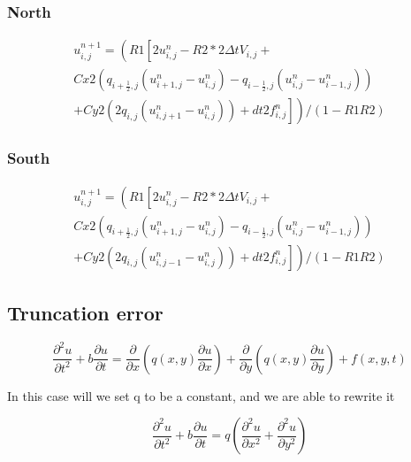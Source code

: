 \documentclass[norsk,11pt,a4paper]{article}
\begin{document}
\subsubsection*{North}
\begin{equation}
\begin{aligned}
u^{n+1}_{i,j}= \left(R1\left[ 2u^n_{i,j}-R2*2\Delta t V_{i,j}+ \right.\right.\\
\left.\left.Cx2\left(q_{i+\frac{1}{2},j}(u^n_{i+1,j}-u^n_{i,j})-q_{i-\frac{1}{2},j}(u^n_{i,j}-u^n_{i-1,j})\right)\right.\right. \\
+ \left.\left.Cy2\left(2q_{i,j}(u^n_{i,j+1}-u^n_{i,j})\right) + dt2 f^n_{i,j}\right]\right)/(1-R1R2)
\end{aligned}
\end{equation}

\subsubsection*{South}
\begin{equation}
\begin{aligned}
u^{n+1}_{i,j}= \left(R1\left[ 2u^n_{i,j}-R2*2\Delta t V_{i,j}+ \right.\right.\\
\left.\left.Cx2\left(q_{i+\frac{1}{2},j}(u^n_{i+1,j}-u^n_{i,j})-q_{i-\frac{1}{2},j}(u^n_{i,j}-u^n_{i-1,j})\right)\right.\right. \\
+ \left.\left.Cy2\left(2q_{i,j}(u^n_{i,j-1}-u^n_{i,j})\right) + dt2 f^n_{i,j}\right]\right)/(1-R1R2)
\end{aligned}
\end{equation}


\subsection*{Truncation error}
\begin{equation}
\frac{\partial^2 u}{\partial t^2} + b \frac{\partial u}{\partial t} = \frac{\partial}{\partial x}\left(q(x,y)\frac{\partial u}{\partial x}\right)+ \frac{\partial}{\partial y}\left(q(x,y)\frac{\partial u}{\partial y}\right)+ f(x,y,t)
\end{equation}

In this case will we set q to be a constant, and we are able to rewrite it

\begin{equation}
\frac{\partial^2 u}{\partial t^2} + b \frac{\partial u}{\partial t} = q\left(\frac{\partial^2 u}{\partial x^2}+\frac{\partial^2 u}{\partial y^2}\right)
\end{equation}
\end{document}
